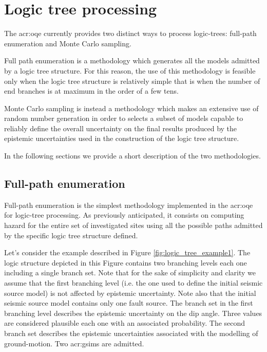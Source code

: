 \section{Logic tree processing}
The \gls{acr:oqe} currently provides two distinct ways to process 
logic-trees: full-path enumeration and Monte Carlo sampling. 

Full path enumeration is a methodology which generates all the 
models admitted by a logic tree structure. 
%
For this reason, the use of this methodology is feasible only when 
the logic tree structure is relatively simple that is when the number 
of end branches is at maximum in the order of a few tens.

Monte Carlo sampling is instead a methodology which makes an extensive 
use of random number generation in order to selects a subset of models 
capable to reliably define the overall uncertainty on the final results 
produced by the epistemic uncertainties used in the construction of the 
logic tree structure. 

In the following sections we provide a short description of 
the two methodologies.
%
\subsection{Full-path enumeration}
Full-path enumeration is the simplest methodology implemented in the
\gls{acr:oqe} for logic-tree processing. 
%
As previously anticipated, it consists on computing hazard 
for the entire set of investigated sites using all the possible paths 
admitted by the specific logic tree structure defined.

Let's consider the example described in Figure \ref{fig:logic_tree_example1}.
The logic structure depicted in this Figure contains two branching levels 
each one including a single branch set. 
%
Note that for the sake of simplicity and clarity we assume that the first 
branching level (i.e. the one used to define the initial seismic source 
model) is not affected by epistemic uncertainty. 
%
Note also that the initial seismic source model contains only one fault 
source.
%
The branch set in the first branching level describes the epistemic 
uncertainty on the dip angle. Three values are considered plausible 
each one with an associated probability.
%
The second branch set describes the epistemic uncertainties associated with 
the modelling of ground-motion. Two \glspl{acr:gsim} are admitted.


